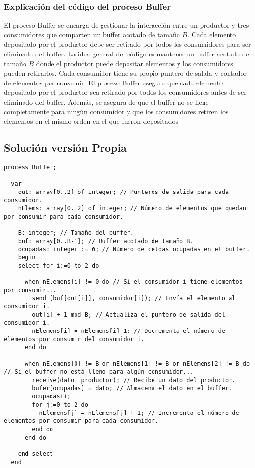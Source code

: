 \documentclass[a4paper,12pt]{article}
\begin{document}
\subsubsection*{Explicación del código del proceso Buffer}

El proceso Buffer se encarga de gestionar la interacción entre un productor y tres consumidores que comparten un buffer acotado de tamaño \( B \). Cada elemento depositado por el productor debe ser retirado por todos los consumidores para ser eliminado del buffer.
La idea general del código es mantener un buffer acotado de tamaño \( B \) donde el productor puede depositar elementos y los consumidores pueden retirarlos. Cada consumidor tiene su propio puntero de salida y contador de elementos por consumir. El proceso Buffer asegura que cada elemento depositado por el productor sea retirado por todos los consumidores antes de ser eliminado del buffer. Además, se asegura de que el buffer no se llene completamente para ningún consumidor y que los consumidores retiren los elementos en el mismo orden en el que fueron depositados.





\subsection{Solución versión Propia}

\begin{lstlisting}[style=customcpp, caption={Pseudocódigo del proceso Buffer}]
  process Buffer;

  var
    out: array[0..2] of integer; // Punteros de salida para cada consumidor.
    nElems: array[0..2] of integer; // Número de elementos que quedan por consumir para cada consumidor.
    
    B: integer; // Tamaño del buffer.
    buf: array[0..B-1]; // Buffer acotado de tamaño B.
    ocupadas: integer := 0; // Número de celdas ocupadas en el buffer.
    begin
    select for i:=0 to 2 do 

      when nElemens[i] != 0 do // Si el consumidor i tiene elementos por consumir...
        send (buf[out[i]], consumidor[i]); // Envía el elemento al consumidor i.
        out[i] + 1 mod B; // Actualiza el puntero de salida del consumidor i.
        nElemens[i] = nElemens[i]-1; // Decrementa el número de elementos por consumir del consumidor i.
      end do
      
      when nElemens[0] != B or nElemens[1] != B or nElemens[2] != B do // Si el buffer no está lleno para algún consumidor...
        receive(dato, productor); // Recibe un dato del productor.
        bufer[ocupadas] = dato; // Almacena el dato en el buffer.
        ocupadas++;
        for j:=0 to 2 do
          nElemens[j] = nElemens[j] + 1; // Incrementa el número de elementos por consumir para cada consumidor.
        end do
      end do

    end select
  end
\end{lstlisting}
\end{document}

